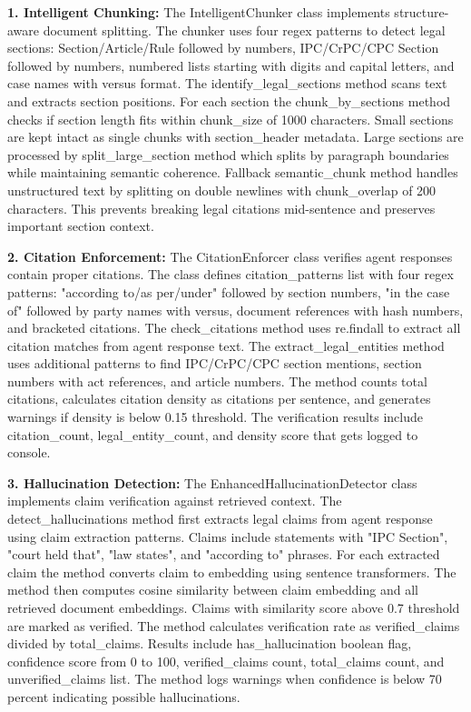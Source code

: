 \documentclass[12pt,singleside,a4paper]{article}
\begin{document}
\textbf{1. Intelligent Chunking:}
The IntelligentChunker class implements structure-aware document splitting. The chunker uses four regex patterns to detect legal sections: Section/Article/Rule followed by numbers, IPC/CrPC/CPC Section followed by numbers, numbered lists starting with digits and capital letters, and case names with versus format. The identify\_legal\_sections method scans text and extracts section positions. For each section the chunk\_by\_sections method checks if section length fits within chunk\_size of 1000 characters. Small sections are kept intact as single chunks with section\_header metadata. Large sections are processed by split\_large\_section method which splits by paragraph boundaries while maintaining semantic coherence. Fallback semantic\_chunk method handles unstructured text by splitting on double newlines with chunk\_overlap of 200 characters. This prevents breaking legal citations mid-sentence and preserves important section context.

\textbf{2. Citation Enforcement:}
The CitationEnforcer class verifies agent responses contain proper citations. The class defines citation\_patterns list with four regex patterns: "according to/as per/under" followed by section numbers, "in the case of" followed by party names with versus, document references with hash numbers, and bracketed citations. The check\_citations method uses re.findall to extract all citation matches from agent response text. The extract\_legal\_entities method uses additional patterns to find IPC/CrPC/CPC section mentions, section numbers with act references, and article numbers. The method counts total citations, calculates citation density as citations per sentence, and generates warnings if density is below 0.15 threshold. The verification results include citation\_count, legal\_entity\_count, and density score that gets logged to console.

\textbf{3. Hallucination Detection:}
The EnhancedHallucinationDetector class implements claim verification against retrieved context. The detect\_hallucinations method first extracts legal claims from agent response using claim extraction patterns. Claims include statements with "IPC Section", "court held that", "law states", and "according to" phrases. For each extracted claim the method converts claim to embedding using sentence transformers. The method then computes cosine similarity between claim embedding and all retrieved document embeddings. Claims with similarity score above 0.7 threshold are marked as verified. The method calculates verification rate as verified\_claims divided by total\_claims. Results include has\_hallucination boolean flag, confidence score from 0 to 100, verified\_claims count, total\_claims count, and unverified\_claims list. The method logs warnings when confidence is below 70 percent indicating possible hallucinations.
\end{document}
